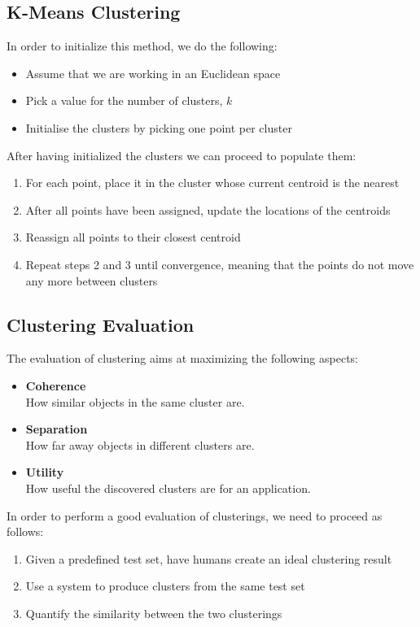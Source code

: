 \documentclass{article}
\begin{document}
\subsection{K-Means Clustering}
In order to initialize this method, we do the following:

\begin{itemize}
	\item Assume that we are working in an Euclidean space
	\item Pick a value for the number of clusters, $k$
	\item Initialise the clusters by picking one point per cluster
\end{itemize}
After having initialized the clusters we can proceed to populate them:

\begin{enumerate}
	\item For each point, place it in the cluster whose current centroid is the nearest
	\item After all points have been assigned, update the locations of the centroids
	\item Reassign all points to their closest centroid
	\item Repeat steps 2 and 3 until convergence, meaning that the points do not move any more between clusters
\end{enumerate}

\subsection{Clustering Evaluation}
The evaluation of clustering aims at maximizing the following aspects:

\begin{itemize}
	\item \textbf{Coherence}
	\vspace{.2cm} \\
	How similar objects in the same cluster are.
	
	\item \textbf{Separation}
	\vspace{.2cm} \\
	How far away objects in different clusters are.
	
	\item \textbf{Utility}
	\vspace{.2cm} \\
	How useful the discovered clusters are for an application.
\end{itemize}
In order to perform a good evaluation of clusterings, we need to proceed as follows:

\begin{enumerate}
	\item Given a predefined test set, have humans create an ideal clustering result
	\item Use a system to produce clusters from the same test set
	\item Quantify the similarity between the two clusterings
\end{enumerate}
\end{document}
